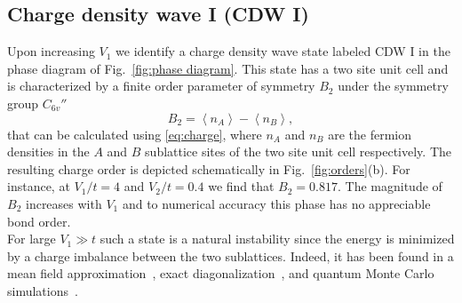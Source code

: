 \documentclass[aps,prx,10pt,twocolumn,floatfix,superscriptaddress,showpacs,numerical,footinbib]{revtex4-1}
\begin{document}
\subsection{Charge density wave I (CDW I)}
%
Upon increasing $V_{1}$ we identify a charge density wave state labeled CDW I in the phase diagram of Fig.~\ref{fig:phase diagram}.
%
This state has a two site unit cell and is characterized by a finite order parameter of symmetry $B_2$ under the symmetry group $C_{6v}''$ \cite{Basko08}
%
\begin{equation}
\label{eq:CDW}
%
B_2=\left\langle n_{A} \right\rangle-\left\langle n_{B}\right\rangle,
%
\end{equation}
%
that can be calculated using \eqref{eq:charge}, where $n_{A}$ and $n_{B}$ are the fermion densities in the $A$ and $B$ sublattice sites of the two site unit cell respectively. 
%
The resulting charge order is depicted schematically in Fig.~\ref{fig:orders}(b). 
%
For instance, at $V_{1}/t = 4$ and $V_{2}/t = 0.4$ we find that $B_2=0.817$.
%
The magnitude of $B_2$ increases with $V_{1}$ and to numerical accuracy this phase has no appreciable bond order.\\
For large $V_{1}\gg t$ such a state is a natural instability since the energy is minimized by a charge imbalance between the two sublattices.
%
Indeed, it has been found in a mean field approximation~\cite{RQHZ08,WF10,GCC13}, exact diagonalization~\cite{GGNVC13,DH14,DCH14}, 
and quantum Monte Carlo simulations~\cite{WCT14}.
%
\end{document}

